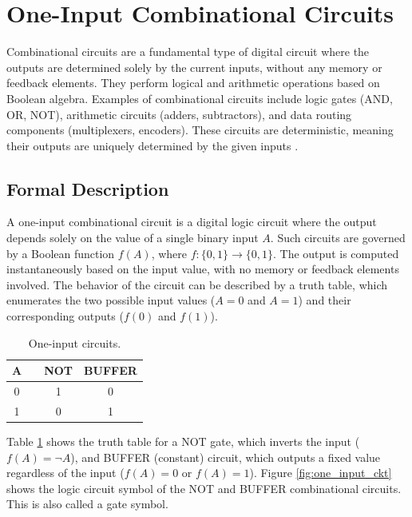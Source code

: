 \section{One-Input Combinational Circuits}
Combinational circuits are a fundamental type of digital circuit where the outputs are determined solely by the current inputs, without any memory or feedback elements. They perform logical and arithmetic operations based on Boolean algebra. Examples of combinational circuits include logic gates (AND, OR, NOT), arithmetic circuits (adders, subtractors), and data routing components (multiplexers, encoders). These circuits are deterministic, meaning their outputs are uniquely determined by the given inputs \cite{mano2017}.

\subsection{Formal Description}
A one-input combinational circuit is a digital logic circuit where the output depends solely on the value of a single binary input \( A \). Such circuits are governed by a Boolean function \( f(A) \), where \( f: \{0, 1\} \to \{0, 1\} \). The output is computed instantaneously based on the input value, with no memory or feedback elements involved. The behavior of the circuit can be described by a truth table, which enumerates the two possible input values (\( A = 0 \) and \( A = 1 \)) and their corresponding outputs (\( f(0) \) and \( f(1) \)). 

\begin{table}[H]
  \begin{center}
    \caption{One-input circuits.}
    \label{tab:one_input_circuits}
    \begin{tabular}{|c||c|c|c|}
      \hline
      A&  &  NOT&  BUFFER      \\ \hline \hline
      0&  &   1&       0    \\ \hline
      1&  &   0&       1    \\ \hline
    \end{tabular}
  \end{center}
\end{table}


Table \ref{tab:one_input_circuits} shows the truth table for a NOT gate, which inverts the input (\( f(A) = \neg A \)), and BUFFER (constant) circuit, which outputs a fixed value regardless of the input (\( f(A) = 0 \) or \( f(A) = 1 \)). Figure \ref{fig:one_input_ckt} shows the logic circuit symbol of the NOT and BUFFER combinational circuits. This is also called a gate symbol.

